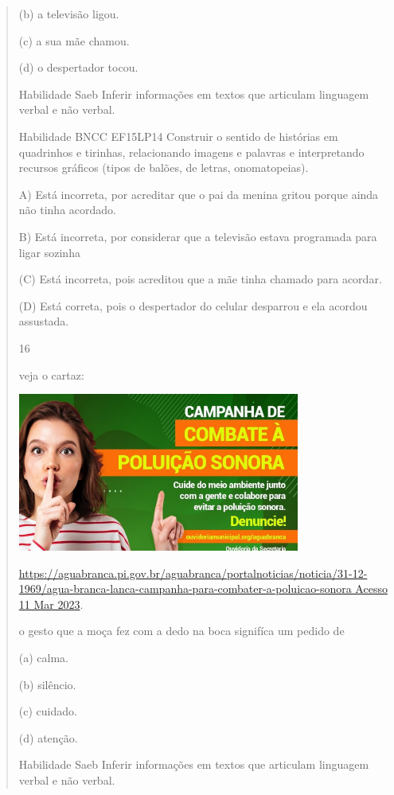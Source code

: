 {{{{\begin{verse}
{{\begin{escolha}
{{{{{(b) a televisão ligou.

(c) a sua mãe chamou.

(d) o despertador tocou.

\protect\hypertarget{_Hlk129586447}{}{}Habilidade Saeb Inferir
informações em textos que articulam linguagem verbal e não verbal.

Habilidade BNCC EF15LP14 Construir o sentido de histórias em quadrinhos
e tirinhas, relacionando imagens e palavras e interpretando recursos
gráficos (tipos de balões, de letras, onomatopeias).

A) Está incorreta, por acreditar que o pai da menina gritou porque ainda
não tinha acordado.

B) Está incorreta, por considerar que a televisão estava programada para
ligar sozinha

(C) Está incorreta, pois acreditou que a mãe tinha chamado para acordar.

(D) Está correta, pois o despertador do celular desparrou e ela acordou
assustada.

\num{16}

veja o cartaz:

\includegraphics[width=3.64744in,height=2.05233in]{media/image173.png}

\href{https://aguabranca.pi.gov.br/aguabranca/portalnoticias/noticia/31-12-1969/agua-branca-lanca-campanha-para-combater-a-poluicao-sonora\%20Acesso\%2011\%20Mar\%202023}{https://aguabranca.pi.gov.br/aguabranca/portalnoticias/noticia/31-12-1969/agua-branca-lanca-campanha-para-combater-a-poluicao-sonora
Acesso 11 Mar 2023}.

o gesto que a moça fez com a dedo na boca signifíca um pedido de

(a) calma.

(b) silêncio.

(c) cuidado.

(d) atenção.

Habilidade Saeb Inferir informações em textos que articulam linguagem
verbal e não verbal.

}}}}}
\end{escolha}}}
\end{verse}}}}}
